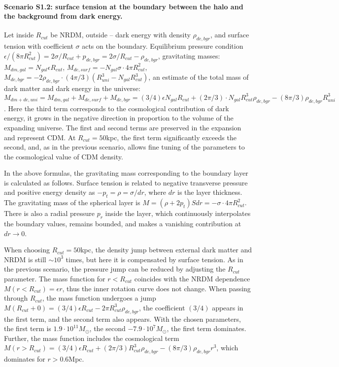 \documentclass{article}
\begin{document}
\paragraph {Scenario S1.2: surface tension at the boundary between the halo and the background from dark energy.} Let inside $ R_ {cut} $ be NRDM, outside -- dark energy with density $ \rho_ {de, bgr} $, and surface tension with coefficient $ \sigma $ acts on the boundary. Equilibrium pressure condition $ \epsilon / (8 \pi R_ {cut} ^ 2) = 2 \sigma / R_ {cut} + p_ {de, bgr} = 2 \sigma / R_ {cut} - \rho_ {de, bgr } $, gravitating masses: $ M_ {dm, gal} = N_ {gal} \epsilon R_ {cut} $, $ M_ {de, surf} = - N_ {gal} \sigma \cdot 4 \pi R_ {cut} ^ 2 $, $ M_ {de, bgr} = - 2 \rho_ {de, bgr} \cdot (4 \pi / 3) (R_ {uni} ^ 3-N_ {gal} R_ {cut} ^ 3) $, an estimate of the total mass of dark matter and dark energy in the universe: $ M_ {dm + de, uni} = M_ {dm, gal} + M_ {de, surf} + M_ {de, bgr} = (3/4) \epsilon N_ {gal} R_ {cut} + (2 \pi / 3) \cdot N_ {gal} R_ {cut} ^ 3 \rho_ {de, bgr} - (8 \pi / 3) \rho_ {de, bgr} R_ {uni} ^ 3 $. Here the third term corresponds to the cosmological contribution of dark energy, it grows in the negative direction in proportion to the volume of the expanding universe. The first and second terms are preserved in the expansion and represent CDM. At $ R_ {cut} = 50 $kpc, the first term significantly exceeds the second, and, as in the previous scenario, allows fine tuning of the parameters to the cosmological value of CDM density.

In the above formulas, the gravitating mass corresponding to the boundary layer is calculated as follows. Surface tension is related to negative transverse pressure and positive energy density as $ -p_t = \rho = \sigma / dr $, where $ dr $ is the layer thickness. The gravitating mass of the spherical layer is $ M = (\rho + 2p_t) Sdr = - \sigma \cdot 4 \pi R_ {cut} ^ 2 $. There is also a radial pressure $ p_r $ inside the layer, which continuously interpolates the boundary values, remains bounded, and makes a vanishing contribution at $ dr \to0 $.

When choosing $ R_ {cut} = 50 $kpc, the density jump between external dark matter and NRDM is still $ \sim10 ^ 3 $ times, but here it is compensated by surface tension. As in the previous scenario, the pressure jump can be reduced by adjusting the $ R_ {cut} $ parameter. The mass function for $ r <R_ {cut} $ coincides with the NRDM dependence $ M (r <R_ {cut}) = \epsilon r $, thus the inner rotation curve does not change. When passing through $ R_ {cut} $, the mass function undergoes a jump $ M (R_ {cut} +0) = (3/4) \epsilon R_ {cut} - 2 \pi R_ {cut} ^ 3 \rho_ {de, bgr} $, the coefficient $ (3/4) $ appears in the first term, and the second term also appears. With the chosen parameters, the first term is $ 1.9 \cdot10 ^ {11} M _ {\odot} $, the second $ -7.9 \cdot10 ^ 7M _ {\odot} $, the first term dominates. Further, the mass function includes the cosmological term $ M (r> R_ {cut}) = (3/4) \epsilon R_ {cut} + (2 \pi / 3) R_ {cut} ^ 3 \rho_ {de, bgr} - (8 \pi / 3) \rho_ {de, bgr} r ^ 3 $, which dominates for $ r> 0.6 $Mpc.
\end{document}
